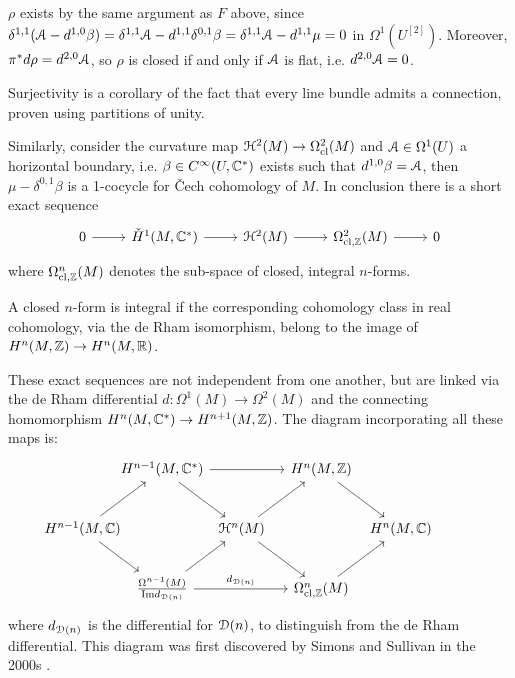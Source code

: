 \documentclass[10pt]{amsart}
\begin{document}
\begin{remark}
	$\rho$ exists by the same argument as $F$ above, since $\delta^{1,1}(\mathcal{A}-d^{1,0}\beta)=\delta^{1,1}\mathcal{A}-d^{1,1}\delta^{0,1}\beta=\delta^{1,1}\mathcal{A}-d^{1,1}\mu=0$ in $\Omega^1(U^{[2]})$. Moreover, $\pi^*d\rho=d^{2,0}\mathcal{A}$, so $\rho$ is closed if and only if $\mathcal{A}$ is flat, i.e. $d^{2,0}\mathcal{A}=0$. 
\end{remark}
\begin{remark}
	Surjectivity is a corollary of the fact that every line bundle admits a connection, proven using partitions of unity. 
\end{remark}
Similarly, consider the curvature map $\mathcal{H}^2(M)\to\Omega^{2}_{\mathrm{cl}}(M)$ and $\mathcal{A}\in\Omega^1(U)$ a horizontal boundary, i.e. $\beta\in C^\infty(U,\mathbb{C}^*)$ exists such that $d^{1,0}\beta=\mathcal{A}$, then $\mu-\delta^{0,1}\beta$ is a 1-cocycle for \v Cech cohomology of $M$. In conclusion there is a short exact sequence \begin{equation}
	\begin{tikzcd}
		0 \arrow[r] & \check{H}^1(M,\bC^*) \arrow[r] & \lH^2(M) \arrow[r] & \Omega^2_{\cl,\bZ}(M) \arrow[r] & 0 
	\end{tikzcd}
\end{equation}where $\Omega^n_{\mathrm{cl},\mathbb{Z}}(M)$ denotes the sub-space of closed, integral $n$-forms.
\begin{remark}
	A closed $n$-form is integral if the corresponding cohomology class in real cohomology, via the de Rham isomorphism, belong to the image of $H^n(M,\mathbb{Z})\to H^n(M,\mathbb{R})$. 
\end{remark}
These exact sequences are not independent from one another, but are linked via the de Rham differential $d:\Omega^1(M)\to\Omega^2(M)$ and the connecting homomorphism $H^n(M,\mathbb{C}^*)\to H^{n+1}(M,\mathbb{Z})$. The diagram incorporating all these maps is:
\begin{equation}
	\begin{tikzcd}[column sep={2cm,between origins},row sep={1.5cm,between origins}]
            & H^{n-1}(M,\bC^*) \arrow[dr]\arrow[rr] & & H^n(M,\bZ) \arrow[dr] & & \\
            H^{n-1}(M,\bC)\arrow[ru]\arrow[rd] & & \lH^n(M) \arrow[dr]\arrow[ru] & & H^n(M,\bC) & \\
            & \frac{\Omega^{n-1}(M)}{\mathrm{Im}d_{\lD(n)}} \arrow[ru]\arrow[rr,"d_{\lD(n)}"] & & \Omega^n_{\cl,\bZ}(M) \arrow[ru] & & 
        \end{tikzcd}
\end{equation}
where $d_{\mathcal{D}(n)}$ is the differential for $\mathcal{D}(n)$, to distinguish from the de Rham differential. This diagram was first discovered by Simons and Sullivan in the 2000s \cite{simonssullivan2008diffcoh}.
\end{document}
